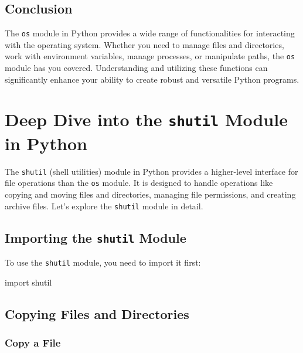 \documentclass[
  letterpaper,
  DIV=11,
  numbers=noendperiod]{scrreprt}
\newenvironment{Shaded}{\begin{snugshade}}{\end{snugshade}}
\newcommand{\ImportTok}[1]{\textcolor[rgb]{0.00,0.46,0.62}{#1}}
\newcommand{\NormalTok}[1]{\textcolor[rgb]{0.00,0.23,0.31}{#1}}
\begin{document}
\section{Conclusion}\label{conclusion-21}

The \texttt{os} module in Python provides a wide range of
functionalities for interacting with the operating system. Whether you
need to manage files and directories, work with environment variables,
manage processes, or manipulate paths, the \texttt{os} module has you
covered. Understanding and utilizing these functions can significantly
enhance your ability to create robust and versatile Python programs.


\chapter{\texorpdfstring{Deep Dive into the \texttt{shutil} Module in
Python}{Deep Dive into the shutil Module in Python}}\label{deep-dive-into-the-shutil-module-in-python}

The \texttt{shutil} (shell utilities) module in Python provides a
higher-level interface for file operations than the \texttt{os} module.
It is designed to handle operations like copying and moving files and
directories, managing file permissions, and creating archive files.
Let's explore the \texttt{shutil} module in detail.

\section{\texorpdfstring{Importing the \texttt{shutil}
Module}{Importing the shutil Module}}\label{importing-the-shutil-module}

To use the \texttt{shutil} module, you need to import it first:

\begin{Shaded}
\begin{Highlighting}[]
\ImportTok{import}\NormalTok{ shutil}
\end{Highlighting}
\end{Shaded}

\section{Copying Files and
Directories}\label{copying-files-and-directories-1}

\subsection{Copy a File}\label{copy-a-file}
\end{document}

